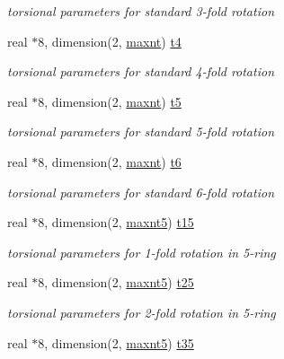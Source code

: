 \begin{DoxyCompactItemize}
\begin{DoxyCompactList}\small\item\em torsional parameters for standard 3-\/fold rotation \end{DoxyCompactList}\item 
real $\ast$8, dimension(2, \hyperlink{classktorsn_a24826636e5e70f0f36f28baf53af9ceb}{maxnt}) \hyperlink{classktorsn_a211e74b9f41c733b130010fdf50cf3f1}{t4}
\begin{DoxyCompactList}\small\item\em torsional parameters for standard 4-\/fold rotation \end{DoxyCompactList}\item 
real $\ast$8, dimension(2, \hyperlink{classktorsn_a24826636e5e70f0f36f28baf53af9ceb}{maxnt}) \hyperlink{classktorsn_a0c28aa237c6d367abf0508ba5112aa54}{t5}
\begin{DoxyCompactList}\small\item\em torsional parameters for standard 5-\/fold rotation \end{DoxyCompactList}\item 
real $\ast$8, dimension(2, \hyperlink{classktorsn_a24826636e5e70f0f36f28baf53af9ceb}{maxnt}) \hyperlink{classktorsn_a3783e6c4f7c898032137ce4ba2fb0fbe}{t6}
\begin{DoxyCompactList}\small\item\em torsional parameters for standard 6-\/fold rotation \end{DoxyCompactList}\item 
real $\ast$8, dimension(2, \hyperlink{classktorsn_a0391ba344c3a8a876ef6d3853b8e1a10}{maxnt5}) \hyperlink{classktorsn_ad57113ae9f68856bf37e9f23d360afc7}{t15}
\begin{DoxyCompactList}\small\item\em torsional parameters for 1-\/fold rotation in 5-\/ring \end{DoxyCompactList}\item 
real $\ast$8, dimension(2, \hyperlink{classktorsn_a0391ba344c3a8a876ef6d3853b8e1a10}{maxnt5}) \hyperlink{classktorsn_aafd204ef3dbe79b5a52495a0bd63f09b}{t25}
\begin{DoxyCompactList}\small\item\em torsional parameters for 2-\/fold rotation in 5-\/ring \end{DoxyCompactList}\item 
real $\ast$8, dimension(2, \hyperlink{classktorsn_a0391ba344c3a8a876ef6d3853b8e1a10}{maxnt5}) \hyperlink{classktorsn_acdb4d85ecd7c07e138efbba63cd09bd7}{t35}

\end{DoxyCompactItemize}
